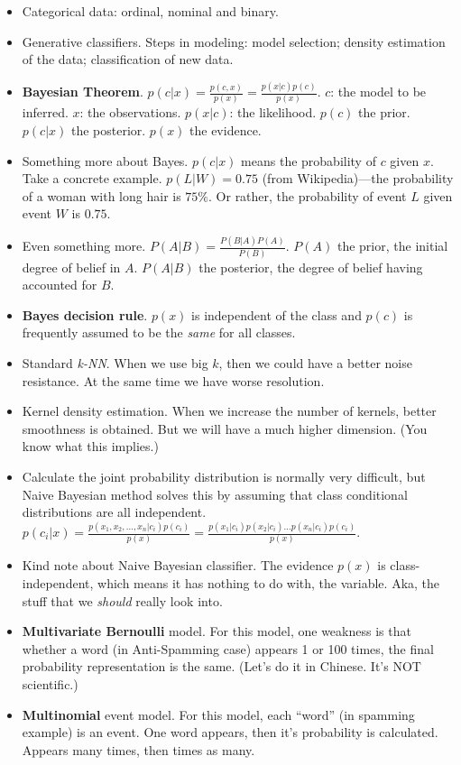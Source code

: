 \documentclass[twocolumn]{article}
\begin{document}
\begin{itemize}
\item Categorical data: ordinal, nominal and binary.
\item Generative classifiers. Steps in modeling: model selection;
  density estimation of the data; classification of new data.
\item \textbf{Bayesian
    Theorem}. $p(c|x)=\frac{p(c,x)}{p(x)}=\frac{p(x|c)p(c)}{p(x)}$. $c$:
  the model to be inferred.  $x$: the observations. $p(x|c)$: the
  likelihood. $p(c)$ the prior. $p(c|x)$ the posterior. $p(x)$ the
  evidence.
\item Something more about Bayes. $p(c|x)$ means the probability of
  $c$ given $x$. Take a concrete example. $p(L|W)=0.75$ (from
  Wikipedia)---the probability of a woman with long hair is $75\%$. Or
  rather, the probability of event $L$ given event $W$ is $0.75$.
\item Even something more. $P(A|B)=\frac{P(B|A)P(A)}{P(B)}$. $P(A)$
  the prior, the initial degree of belief in $A$. $P(A|B)$ the
  posterior, the degree of belief having accounted for $B$.
\item \textbf{Bayes decision rule}. $p(x)$ is independent of the class
  and $p(c)$ is frequently assumed to be the \emph{same} for all
  classes.
\item Standard \emph{k-NN}. When we use big $k$, then we could have a
  better noise resistance. At the same time we have worse resolution.
\item Kernel density estimation. When we increase the number of
  kernels, better smoothness is obtained. But we will have a much
  higher dimension. (You know what this implies.)
\item Calculate the joint probability distribution is normally very
  difficult, but Naive Bayesian method solves this by assuming that
  class conditional distributions are all
  independent. $p(c_{i}|x)=\frac{p(x_{1},x_{2},\ldots,x_{n}|c_{i})p(c_{i})}{p(x)}=\frac{p(x_{1}|c_{i})p(x_{2}|c_{i})\ldots
    p(x_{n}|c_{i})p(c_{i})}{p(x)}$.
\item Kind note about Naive Bayesian classifier. The evidence $p(x)$
  is class-independent, which means it has nothing to do with, the
  variable. Aka, the stuff that we \emph{should} really look into.
\item \textbf{Multivariate Bernoulli} model. For this model, one
  weakness is that whether a word (in Anti-Spamming case) appears 1 or
  100 times, the final probability representation is the same. (Let's
  do it in Chinese. It's NOT scientific.) 
\item \textbf{Multinomial} event model. For this model, each ``word''
  (in spamming example) is an event. One word appears, then it's
  probability is calculated. Appears many times, then times as many.
\end{itemize}
\end{document}
